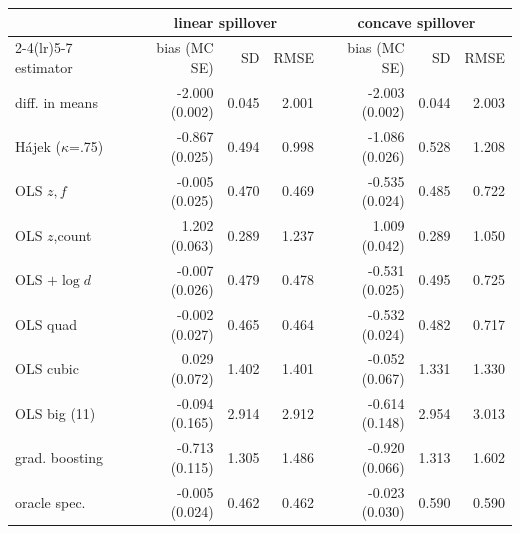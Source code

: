 \begin{tabular}{lrrrrrr}
\toprule
 & \multicolumn{3}{c}{linear spillover} & \multicolumn{3}{c}{concave spillover} \\
\cmidrule(lr){2-4}\cmidrule(lr){5-7}
 estimator & bias (MC SE) & SD & RMSE & bias (MC SE) & SD & RMSE \\
\midrule
diff. in means & -2.000 (0.002) & 0.045 & 2.001 & -2.003 (0.002) & 0.044 & 2.003 \\
Hájek ($\kappa$=.75) & -0.867 (0.025) & 0.494 & 0.998 & -1.086 (0.026) & 0.528 & 1.208 \\
OLS $z,f$ & -0.005 (0.025) & 0.470 & 0.469 & -0.535 (0.024) & 0.485 & 0.722 \\
OLS $z$,count & 1.202 (0.063) & 0.289 & 1.237 & 1.009 (0.042) & 0.289 & 1.050 \\
OLS $+\log d$ & -0.007 (0.026) & 0.479 & 0.478 & -0.531 (0.025) & 0.495 & 0.725 \\
OLS quad & -0.002 (0.027) & 0.465 & 0.464 & -0.532 (0.024) & 0.482 & 0.717 \\
OLS cubic & 0.029 (0.072) & 1.402 & 1.401 & -0.052 (0.067) & 1.331 & 1.330 \\
OLS big (11) & -0.094 (0.165) & 2.914 & 2.912 & -0.614 (0.148) & 2.954 & 3.013 \\
grad. boosting & -0.713 (0.115) & 1.305 & 1.486 & -0.920 (0.066) & 1.313 & 1.602 \\
oracle spec. & -0.005 (0.024) & 0.462 & 0.462 & -0.023 (0.030) & 0.590 & 0.590 \\
\bottomrule
\end{tabular}
